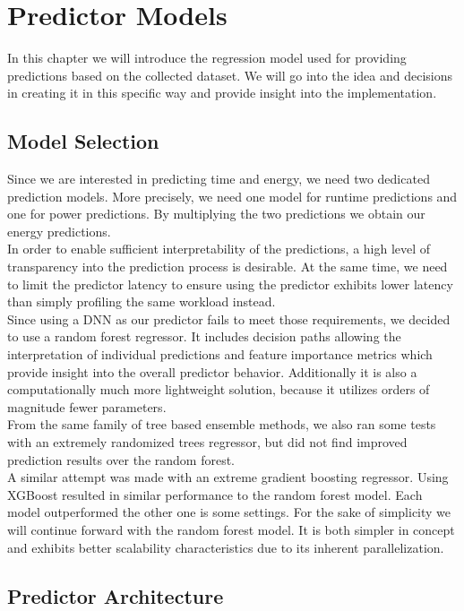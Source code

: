 \chapter{Predictor Models}\label{chap:contrib2}

In this chapter we will introduce the regression model used for providing predictions based on the collected dataset. We will go into the idea and decisions in creating it in this specific way and provide insight into the implementation.


\section{Model Selection}
Since we are interested in predicting time and energy, we need two dedicated prediction models. More precisely, we need one model for runtime predictions and one for power predictions. By multiplying the two predictions we obtain our energy predictions. \\
In order to enable sufficient interpretability of the predictions, a high level of transparency into the prediction process is desirable. At the same time, we need to limit the predictor latency to ensure using the predictor exhibits lower latency than simply profiling the same workload instead. \\
Since using a DNN as our predictor fails to meet those requirements, we decided to use a random forest regressor. It includes decision paths allowing the interpretation of individual predictions and feature importance metrics which provide insight into the overall predictor behavior. Additionally it is also a computationally much more lightweight solution, because it utilizes orders of magnitude fewer parameters. \\
From the same family of tree based ensemble methods, we also ran some tests with an extremely randomized trees regressor, but did not find improved prediction results over the random forest. \\
A similar attempt was made with an extreme gradient boosting regressor. Using XGBoost resulted in similar performance to the random forest model. Each model outperformed the other one is some settings. For the sake of simplicity we will continue forward with the random forest model. It is both simpler in concept and exhibits better scalability characteristics due to its inherent parallelization.



\section{Predictor Architecture}

